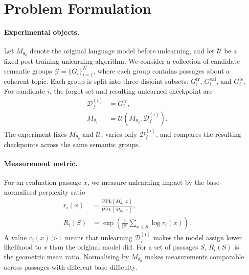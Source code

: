 \documentclass[11pt,a4paper]{article}
\newcommand{\Df}{\mathcal{D}_f}
\newcommand{\PPL}{\mathrm{PPL}}
\begin{document}
\section{Problem Formulation}
\label{sec:problem}

\paragraph{Experimental objects.}
Let $M_{\theta_0}$ denote the original language model before unlearning, and
let $\mathcal{U}$ be a fixed post-training unlearning algorithm. We consider a
collection of candidate semantic groups
$\mathcal{G}=\{G_i\}_{i=1}^{N}$, where each group contains passages about a
coherent topic. Each group is split into three disjoint subsets:
$G_i^{\mathrm{tr}}$, $G_i^{\mathrm{val}}$, and $G_i^{\mathrm{te}}$. For
candidate $i$, the forget set and resulting unlearned checkpoint are
\begin{align}
    \Df^{(i)} &= G_i^{\mathrm{tr}},\\
    M_{\theta_i} &= \mathcal{U}(M_{\theta_0}, \Df^{(i)}).
\end{align}
The experiment fixes $M_{\theta_0}$ and $\mathcal{U}$, varies only
$\Df^{(i)}$, and compares the resulting checkpoints across the same semantic
groups.

\paragraph{Measurement metric.}
For an evaluation passage $x$, we measure unlearning impact by the
base-normalised perplexity ratio
\begin{align}
    r_i(x)
    &=
    \frac{\PPL(M_{\theta_i}, x)}
         {\PPL(M_{\theta_0}, x)},\\
    R_i(S)
    &=
    \exp\!\left(
    \frac{1}{|S|}\sum_{x\in S}\log r_i(x)
    \right).
\end{align}
A value $r_i(x)>1$ means that unlearning $\Df^{(i)}$ makes the model assign
lower likelihood to $x$ than the original model did. For a set of passages
$S$, $R_i(S)$ is the geometric mean ratio. Normalising by $M_{\theta_0}$ makes
measurements comparable across
passages with different base difficulty.

\end{document}
